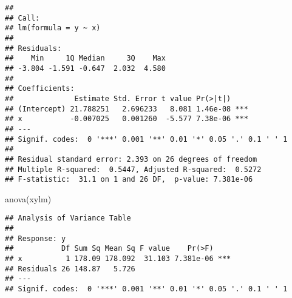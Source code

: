 \documentclass[
]{article}
\newenvironment{Shaded}{\begin{snugshade}}{\end{snugshade}}
\newcommand{\FunctionTok}[1]{\textcolor[rgb]{0.00,0.00,0.00}{#1}}
\newcommand{\NormalTok}[1]{#1}
\begin{document}
\begin{verbatim}
## 
## Call:
## lm(formula = y ~ x)
## 
## Residuals:
##    Min     1Q Median     3Q    Max 
## -3.804 -1.591 -0.647  2.032  4.580 
## 
## Coefficients:
##              Estimate Std. Error t value Pr(>|t|)    
## (Intercept) 21.788251   2.696233   8.081 1.46e-08 ***
## x           -0.007025   0.001260  -5.577 7.38e-06 ***
## ---
## Signif. codes:  0 '***' 0.001 '**' 0.01 '*' 0.05 '.' 0.1 ' ' 1
## 
## Residual standard error: 2.393 on 26 degrees of freedom
## Multiple R-squared:  0.5447, Adjusted R-squared:  0.5272 
## F-statistic:  31.1 on 1 and 26 DF,  p-value: 7.381e-06
\end{verbatim}

\begin{Shaded}
\begin{Highlighting}[]
\FunctionTok{anova}\NormalTok{(xylm)}
\end{Highlighting}
\end{Shaded}

\begin{verbatim}
## Analysis of Variance Table
## 
## Response: y
##           Df Sum Sq Mean Sq F value    Pr(>F)    
## x          1 178.09 178.092  31.103 7.381e-06 ***
## Residuals 26 148.87   5.726                      
## ---
## Signif. codes:  0 '***' 0.001 '**' 0.01 '*' 0.05 '.' 0.1 ' ' 1
\end{verbatim}
\end{document}
